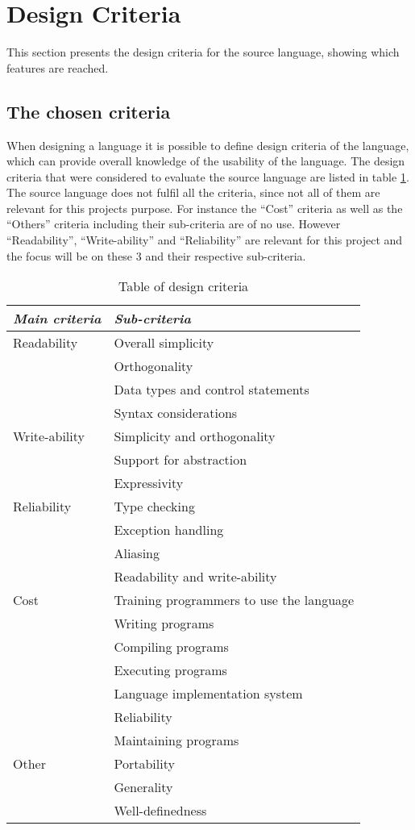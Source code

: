 \chapter{Design Criteria}\label{chap:design-criteria}
This section presents the design criteria for the source language, showing which features are reached. 

\section{The chosen criteria}
When designing a language it is possible to define design criteria of the language, which can provide overall knowledge of the usability of the language. The design criteria that were considered to evaluate the source language are listed in table \ref{chap:design-criteria}. The source language does not fulfil all the criteria, since not all of them are relevant for this projects purpose. For instance the ``Cost'' criteria as well as the ``Others'' criteria including their sub-criteria are of no use. However ``Readability'', ``Write-ability'' and ``Reliability'' are relevant for this project and the focus will be on these 3 and their respective sub-criteria.

\begin{table}[H]
	\center
	\begin{tabular}{|l|l|}
	\hline
	\emph{Main criteria} & \emph{Sub-criteria} \\ 
 		\hline
 		Readability & Overall simplicity \\
 		 & Orthogonality \\
 		 & Data types and control statements \\
 		 & Syntax considerations \\
 		\hline
 		Write-ability & Simplicity and orthogonality  \\
 		 & Support for abstraction \\
 		 & Expressivity \\
 		\hline
 		Reliability & Type checking \\
 		 & Exception handling \\
 		 & Aliasing \\
 		 & Readability and write-ability \\
 		\hline
 		Cost & Training programmers to use the language \\
 		 & Writing programs \\
 		 & Compiling programs \\
 		 & Executing programs \\
 		 & Language implementation system \\
 		 & Reliability \\
 		 & Maintaining programs \\
 		\hline
 		Other & Portability \\
 		 & Generality \\
 		 & Well-definedness \\
 		\hline
	\end{tabular}
	\label{tab:design}
	\caption{Table of design criteria}
\end{table} 

